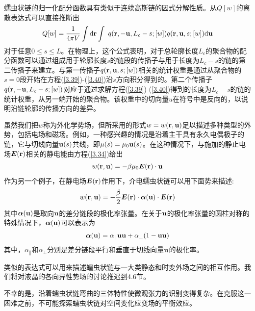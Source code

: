 蠕虫状链的归一化配分函数具有类似于连续高斯链的因式分解性质。从$Q[w]$的离散表达式可以直接推断出
\begin{equation}\label{3.41}
Q[w]=\frac{1}{4\pi V}\int\mathrm{d}\mathbf{r}\int~q(\mathbf{r},-\mathbf{u},L_c-s;[w])q(\mathbf{r},\mathbf{u},s;[w])\mathrm{d}\mathbf{u}
\end{equation}
对于任意$0\le s\le L$。在物理上，这个公式表明，对于总轮廓长度$L_c$的聚合物的配分函数可以通过组成用于轮廓长度$s$的链段的传播子与用于长度为$L_c-s$的链的第二传播子来建立。与第一传播子$q(\mathbf{r},\mathbf{u},s;[w])$相关的统计权重是通过从聚合物的$s=0$段开始在方程(\ref{3.39})-(\ref{3.40})沿$s$方向积分得到的。第二个传播子$q(\mathbf{r},-\mathbf{u},L_c-s;[w])$对应于通过求解方程(\ref{3.39})-(\ref{3.40})得到的长度为$L_c-s$的链的统计权重，从另一端开始的聚合物。该权重中的切向量$u$在符号中是反向的，以说明沿链轮廓的传播方向的差异。

虽然我们把$w$称为外化学势场，但所采用的形式$w=w(\mathbf{r},\mathbf{u})$足以描述多种类型的外势，包括电场和磁场。例如，一种感兴趣的情况是沿着主干具有永久电偶极子的链，它与切线向量$\mathbf{u}(s)$共线，即$\mu(s)=\mu_0\mathbf{u}(s)$。在这种情况下，与施加的静止电场$\bm{E}(\mathbf{r})$相关的静电能由方程(\ref{3.34})给出
\begin{equation}\label{3.42}
w(\mathbf{r},\mathbf{u})=-\beta\mu_0\bm{E}(\mathbf{r})\cdot\mathbf{u}
\end{equation}
作为另一个例子，在静电场$\bm{E}(\mathbf{r})$作用下，介电蠕虫状链可以用下面势来描述:
\begin{equation}\label{3.43}
w(\mathbf{r},\mathbf{u})=-\frac{\beta}{2}\bm{E}(\mathbf{r})\cdot\boldsymbol{\alpha}(\mathbf{u})\cdot\bm{E}(\mathbf{r})
\end{equation}
其中$\boldsymbol{\alpha}(\mathbf{u})$是取向$\mathbf{u}$的差分链段的极化率张量。在关于$\mathbf{u}$的极化率张量的圆柱对称的特殊情况下，$\boldsymbol{\alpha}(\mathbf{u})$可以表示为
\begin{equation}\label{3.44}
\boldsymbol{\alpha}(\mathbf{u})=\alpha_{\parallel}\mathbf{u}\mathbf{u}+\alpha_{\perp}(1-\mathbf{u}\mathbf{u})
\end{equation}
其中，$\alpha_{\parallel}$和$\alpha_{\perp}$分别是差分链段平行和垂直于切线向量$\mathbf{u}$的极化率。

类似的表达式可以用来描述蠕虫状链与一大类静态和时变外场之间的相互作用。我们将对液晶的各向异性势场的讨论推迟到4.6节。

不幸的是，沿着蠕虫状链弯曲的三体特性使微观张力的识别变得复杂。在克服这一困难之前，不可能探索蠕虫状链对空间变化应变场的平衡效应。
